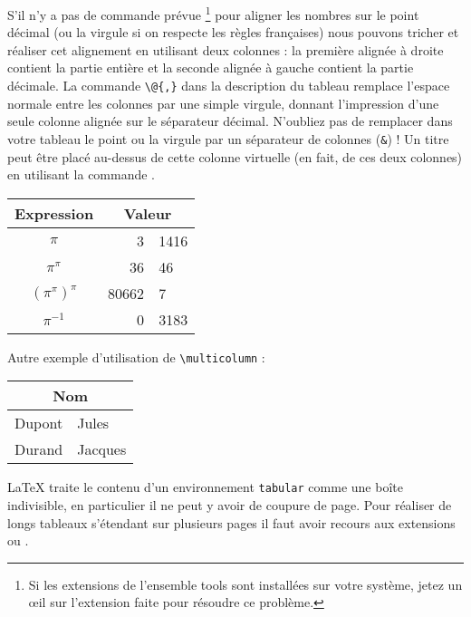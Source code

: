 %
%

 S'il n'y a pas de commande prévue%
\footnote{Si les extensions de l'ensemble \og tools \fg{} sont installées
          sur votre système, jetez un \oe il sur l'extension
           faite pour résoudre ce problème.}
pour aligner les nombres sur le point décimal (ou la virgule si on
respecte les règles françaises) nous pouvons \og tricher \fg{} et
réaliser cet alignement en utilisant deux colonnes : la première
alignée à droite contient la partie entière et la seconde alignée à
gauche contient la partie décimale. La commande \verb|\@{,}| dans la
description du tableau remplace l'espace normale entre les colonnes par
une simple virgule, donnant l'impression d'une seule colonne alignée
sur le séparateur décimal. N'oubliez pas de remplacer dans votre
tableau le point ou la virgule
par un séparateur de colonnes (\verb|&|) ! Un titre peut être
placé au-dessus de cette \og colonne virtuelle \fg (en fait, de ces deux
colonnes) en utilisant la commande .

\begin{example}
\begin{tabular}{c r @{,} l}
Expression       &
\multicolumn{2}{c}{Valeur} \\
\hline
$\pi$               & 3&1416  \\
$\pi^{\pi}$         & 36&46   \\
$(\pi^{\pi})^{\pi}$ & 80662&7 \\
$\pi^{-1}$          & 0&3183 \\
\end{tabular}
\end{example}
Autre exemple d'utilisation de \verb+\multicolumn+ :
\begin{example}
\begin{tabular}{|l|l|}
\hline
\multicolumn{2}{|c|}{%
  \textbf{Nom}} \\
\hline
Dupont & Jules \\
Durand & Jacques \\
\hline
\end{tabular}
\end{example}

\LaTeX{} traite le contenu d'un environnement \texttt{tabular} comme
une boîte indivisible, en particulier il ne peut y avoir de coupure de
page. Pour réaliser de longs tableaux s'étendant sur plusieurs pages
il faut avoir recours aux extensions  ou
.

